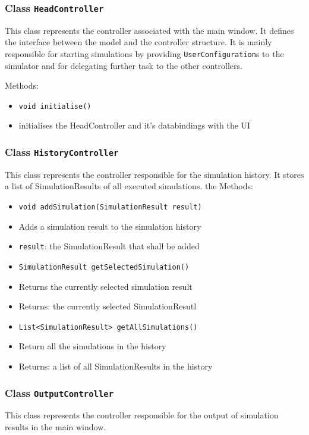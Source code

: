 \documentclass[parskip=full,11pt]{scrartcl}
\begin{document}
\subsubsection{Class \texttt{HeadController}}
This class represents the controller associated with the main window. It defines the interface between the model and the controller structure. It is mainly responsible for starting simulations by providing \texttt{UserConfiguration}s to the simulator and for delegating further task to the other controllers.

Methods:
\begin{itemize}\itemsep -10pt
\item \texttt{void initialise()}
\item[] initialises the HeadController and it's databindings with the UI
\end{itemize}

\subsubsection{Class \texttt{HistoryController}}
This class represents the controller responsible for the simulation history. It stores a list of SimulationResults of all executed simulations.
the
Methods:
\begin{itemize}\itemsep -10pt
\item \texttt{void addSimulation(SimulationResult result)}
\item[] Adds a simulation result to the simulation history
\item[] \texttt{result}: the SimulationResult that shall be added

\item \texttt{SimulationResult getSelectedSimulation()}
\item[] Returns the currently selected simulation result
\item[] Returns: the currently selected SimulationResutl

\item \texttt{List<SimulationResult> getAllSimulations()}
\item[] Return all the simulations in the history
\item[] Returns: a list of all SimulationResults in the history
\end{itemize}

\subsubsection{Class \texttt{OutputController}}
This class represents the controller responsible for the output of simulation results in the main window.
\end{document}
